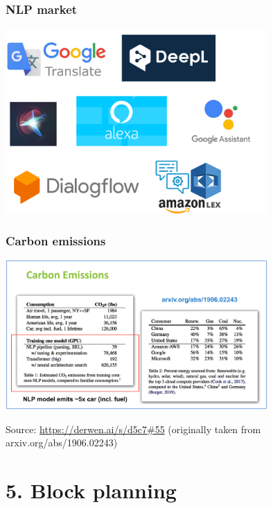 \documentclass{beamer}
\begin{document}
\begin{frame}

\frametitle{NLP market}

\centerline{\includegraphics[width=10cm]{./figs/sota_companies.png}}
\end{frame}

\begin{frame}

\frametitle{Carbon emissions}

\centerline{\includegraphics[width=10cm]{./figs/emissions.png}}

\tiny
Source: \url{https://derwen.ai/s/d5c7#55} (originally taken from arxiv.org/abs/1906.02243)
\end{frame}

\section{5. Block planning}
\end{document}
